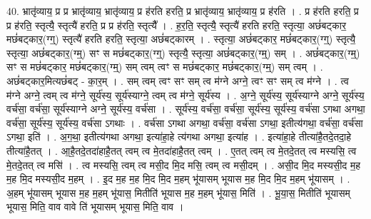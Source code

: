 \documentclass[17pt]{extarticle}
\begin{document}
40. भ्रातृ॑व्याय॒ प्र प्र भ्रातृ॑व्याय॒ भ्रातृ॑व्याय॒ प्र ह॑रति हरति॒ प्र भ्रातृ॑व्याय॒ भ्रातृ॑व्याय॒ प्र ह॑रति । . प्र ह॑रति हरति॒ प्र प्र ह॑रति॒ स्तृत्यै॒ स्तृत्यै॑ हरति॒ प्र प्र ह॑रति॒ स्तृत्यै᳚ । . ह॒र॒ति॒ स्तृत्यै॒ स्तृत्यै॑ हरति हरति॒ स्तृत्या॒ अछं॑बट्कार॒ मछं॑बट्कार॒(ग्ग्॒) स्तृत्यै॑ हरति हरति॒ स्तृत्या॒ अछं॑बट्कारम् । . स्तृत्या॒ अछं॑बट्कार॒ मछं॑बट्कार॒(ग्ग्॒) स्तृत्यै॒ स्तृत्या॒ अछं॑बट्कार॒(ग्म्॒) सꣳ स मछं॑बट्कार॒(ग्ग्॒) स्तृत्यै॒ स्तृत्या॒ अछं॑बट्कार॒(ग्म्॒) सम् । . अछं॑बट्कार॒(ग्म्॒) सꣳ स मछं॑बट्कार॒ मछं॑बट्कार॒(ग्म्॒) सम् त्वम् त्वꣳ स मछं॑बट्कार॒ मछं॑बट्कार॒(ग्म्॒) सम् त्वम् । . अछं॑बट्कार॒मित्यछं॑बट् - का॒र॒म् । . सम् त्वम् त्वꣳ सꣳ सम् त्व म॑ग्ने अग्ने॒ त्वꣳ सꣳ सम् त्व म॑ग्ने । . त्व म॑ग्ने अग्ने॒ त्वम् त्व म॑ग्ने॒ सूर्य॑स्य॒ सूर्य॑स्याग्ने॒ त्वम् त्व म॑ग्ने॒ सूर्य॑स्य । . अ॒ग्ने॒ सूर्य॑स्य॒ सूर्य॑स्याग्ने अग्ने॒ सूर्य॑स्य॒ वर्च॑सा॒ वर्च॑सा॒ सूर्य॑स्याग्ने अग्ने॒ सूर्य॑स्य॒ वर्च॑सा । . सूर्य॑स्य॒ वर्च॑सा॒ वर्च॑सा॒ सूर्य॑स्य॒ सूर्य॑स्य॒ वर्च॑सा ऽगथा अगथा॒ वर्च॑सा॒ सूर्य॑स्य॒ सूर्य॑स्य॒ वर्च॑सा ऽगथाः । . वर्च॑सा ऽगथा अगथा॒ वर्च॑सा॒ वर्च॑सा ऽगथा॒ इतीत्य॑गथा॒ वर्च॑सा॒ वर्च॑सा ऽगथा॒ इति॑ । . अ॒ग॒था॒ इतीत्य॑गथा अगथा॒ इत्या॑हा॒हे त्य॑गथा अगथा॒ इत्या॑ह । . इत्या॑हा॒हे तीत्या॑है॒तदे॒तदा॒हे तीत्या॑है॒तत् । . आ॒है॒तदे॒तदा॑हाहै॒तत् त्वम् त्व मे॒तदा॑हाहै॒तत् त्वम् । . ए॒तत् त्वम् त्व मे॒तदे॒तत् त्व मस्यसि॒ त्व मे॒तदे॒तत् त्व मसि॑ । . त्व मस्यसि॒ त्वम् त्व मसी॒द मि॒द मसि॒ त्वम् त्व मसी॒दम् । . असी॒द मि॒द मस्यसी॒द म॒ह म॒ह मि॒द मस्यसी॒द म॒हम् । . इ॒द म॒ह म॒ह मि॒द मि॒द म॒हम् भू॑यासम् भूयास म॒ह मि॒द मि॒द म॒हम् भू॑यासम् । . अ॒हम् भू॑यासम् भूयास म॒ह म॒हम् भू॑यास॒ मितीति॑ भूयास म॒ह म॒हम् भू॑यास॒ मिति॑ । . भू॒या॒स॒ मितीति॑ भूयासम् भूयास॒ मिति॒ वाव वावे ति॑ भूयासम् भूयास॒ मिति॒ वाव । \newline
\end{document}
